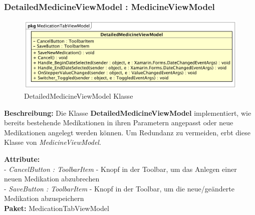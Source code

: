 \documentclass[a4paper]{scrreprt}
\begin{document}
\subsubsection{DetailedMedicineViewModel : MedicineViewModel}
\begin{figure}[H]
\centering
\includegraphics[width=0.75\textheight]{graphics/Klassendiagramme/ViewModel/DetailedMedicineViewModel.png}
\caption{DetailedMedicineViewModel Klasse}
\end{figure}

\textbf{Beschreibung:} Die Klasse \textbf{DetailedMedicineViewModel} implementiert, wie bereits bestehende Medikationen in ihren Parametern angepasst oder neue Medikationen angelegt werden können. Um Redundanz zu vermeiden, erbt diese Klasse von \textit{MedicineViewModel}.

\textbf{Attribute:}\\
- \textit{CancelButton : ToolbarItem} - Knopf in der Toolbar, um das Anlegen einer neuen Medikation abzubrechen\\
- \textit{SaveButton : ToolbarItem} - Knopf in der Toolbar, um die neue/geänderte Medikation abzuspeichern\\

\textbf{Paket:} MedicationTabViewModel
\end{document}
